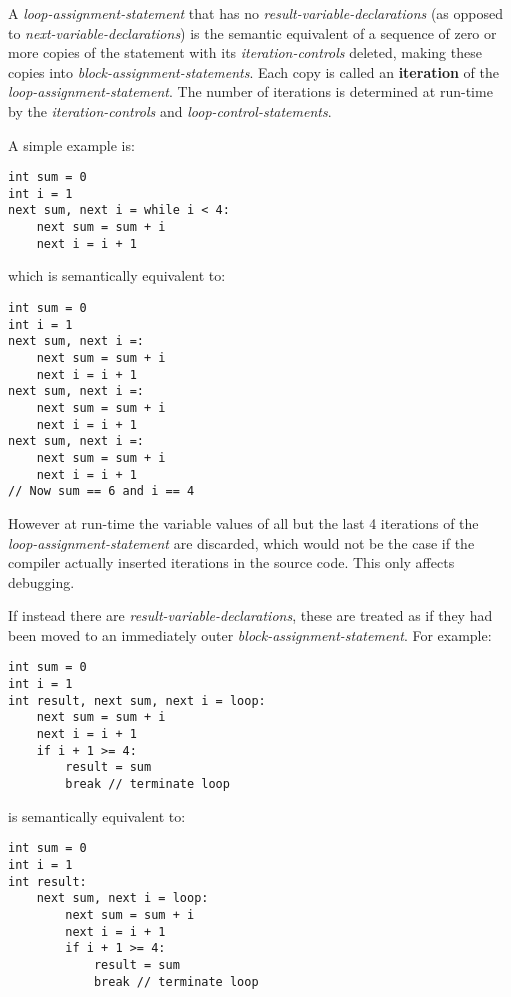 \documentclass[12pt]{article}
\newcommand{\key}[1]{{\rm \bfseries #1}}
\newenvironment{indpar}[1][0.3in]%
	{\begin{list}{}%
		     {\setlength{\itemsep}{0in}%
		      \setlength{\topsep}{0in}%
		      \setlength{\parsep}{1ex}%
		      \setlength{\labelwidth}{#1}%
		      \setlength{\leftmargin}{#1}%
		      \addtolength{\leftmargin}{\labelsep}}%
	 \item}%
	{\end{list}}
\begin{document}
A {\em loop-assignment-statement} that has no {\em result-variable-declarations}
(as opposed to {\em next-variable-declarations})
is the semantic equivalent of
a sequence of zero or more copies of the statement with
its {\em iteration-controls} deleted, making these copies into
{\em block-assignment-statements}.  Each copy is called an
\key{iteration} of the {\em loop-assignment-statement}.
The number of iterations is
determined at run-time by the {\em iteration-controls}
and {\em loop-control-statements}.

A simple example is:
\begin{indpar}\begin{verbatim}
int sum = 0
int i = 1
next sum, next i = while i < 4:
    next sum = sum + i
    next i = i + 1
\end{verbatim}\end{indpar}
which is semantically equivalent to:
\begin{indpar}\begin{verbatim}
int sum = 0
int i = 1
next sum, next i =:
    next sum = sum + i
    next i = i + 1
next sum, next i =:
    next sum = sum + i
    next i = i + 1
next sum, next i =:
    next sum = sum + i
    next i = i + 1
// Now sum == 6 and i == 4
\end{verbatim}\end{indpar}

However at run-time the variable values of all but the
last 4 iterations of the {\em loop-assignment-statement}
are discarded, which would not be the case if the compiler
actually inserted iterations in the source code. 
This only affects debugging.

If instead there are {\em result-variable-declarations}, these are
treated as if they had been moved to an immediately outer
{\em block-assignment-statement}.  For example:
\begin{indpar}\begin{verbatim}
int sum = 0
int i = 1
int result, next sum, next i = loop:
    next sum = sum + i
    next i = i + 1
    if i + 1 >= 4:
        result = sum
        break // terminate loop
\end{verbatim}\end{indpar}
is semantically equivalent to:
\begin{indpar}\begin{verbatim}
int sum = 0
int i = 1
int result:
    next sum, next i = loop:
        next sum = sum + i
        next i = i + 1
        if i + 1 >= 4:
            result = sum
            break // terminate loop
\end{verbatim}\end{indpar}
\end{document}
